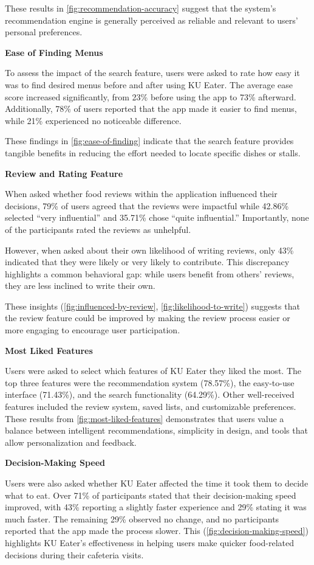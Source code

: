 These results in \ref{fig:recommendation-accuracy} suggest that the system's recommendation engine is generally perceived as reliable and relevant to users' personal preferences.

\textbf{Ease of Finding Menus}

To assess the impact of the search feature, users were asked to rate how easy it was to find desired menus before and after using KU Eater.
The average ease score increased significantly, from 23\% before using the app to 73\% afterward.
Additionally, 78\% of users reported that the app made it easier to find menus, while 21\% experienced no noticeable difference.

These findings in \ref{fig:ease-of-finding} indicate that the search feature provides tangible benefits in reducing the effort needed to locate specific dishes or stalls.

\textbf{Review and Rating Feature}

When asked whether food reviews within the application influenced their decisions, 79\% of users agreed that the reviews were impactful while 
42.86\% selected “very influential” and 35.71\% chose “quite influential.” Importantly, none of the participants rated the reviews as unhelpful. 

However, when asked about their own likelihood of writing reviews, only 43\% indicated that they were
likely or very likely to contribute. This discrepancy highlights a common behavioral gap: while users benefit from others' reviews,
they are less inclined to write their own.

These insights (\ref{fig:influenced-by-review}, \ref{fig:likelihood-to-write}) suggests that the review feature
could be improved by making the review process easier or more engaging to encourage user participation.

\textbf{Most Liked Features}

Users were asked to select which features of KU Eater they liked the most. The top three features were the recommendation system
(78.57\%), the easy-to-use interface (71.43\%), and the search functionality (64.29\%). Other well-received features
included the review system, saved lists, and customizable preferences.
These results from \ref{fig:most-liked-features} demonstrates that users value a balance between intelligent recommendations, simplicity in design, and tools that allow personalization and feedback.

\textbf{Decision-Making Speed}

Users were also asked whether KU Eater affected the time it took them to decide what to eat. Over 71\% of participants stated that
their decision-making speed improved, with 43\% reporting a slightly faster experience and 29\% stating
it was much faster. The remaining 29\% observed no change, and no participants reported that the app made the
process slower. This (\ref{fig:decision-making-speed}) highlights KU Eater's effectiveness in helping users make quicker food-related decisions during their cafeteria visits.

